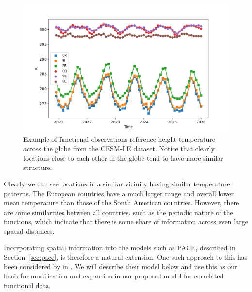  \begin{figure}[htbp!] 
	\centering    
	\includegraphics[width=1.0\textwidth]{TREFHT_example_space_temp}
	\caption[An example of spatial correlation in the TREFHT variable from the CESM-LE dataset.]{Example of functional observations reference height temperature across the globe from the CESM-LE dataset. Notice that clearly locations close to each other in the globe tend to have more similar structure.}
	\label{fig:cesm-space}
\end{figure}
Clearly we can see locations in a similar vicinity having similar temperature patterns.
The European countries have a much larger range and overall lower mean temperature than those of the South American countries.
However, there are some similarities between all countries, such as the periodic nature of the functions, which indicate that there is some share of information across even large spatial distances. 

Incorporating spatial information into the models such as PACE, described in Section~\ref{sec:pace}, is therefore a natural extension. 
One such approach to this has been considered by \citeauthor{liu_functional_2017} in \citep{liu_functional_2017}. 
We will describe their model below and use this as our basis for modification and expansion in our proposed model for correlated functional data.

